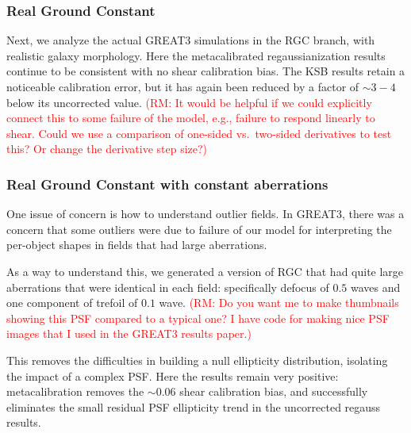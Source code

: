 \documentclass[iop]{emulateapj}
\newcommand\rmcomment[1]{\textcolor{red}{(RM: #1)}}
\begin{document}
\subsubsection{Real Ground Constant}

Next, we analyze the actual GREAT3 simulations in the RGC branch, with
realistic galaxy morphology. Here the metacalibrated regaussianization
results continue to be consistent with no shear calibration bias. The
KSB results retain a noticeable calibration error, but it has again
been reduced by a factor of $\sim3-4$ below its uncorrected value. 
\rmcomment{It would be helpful if we could explicitly connect this to some failure of the model,
  e.g., failure to respond linearly to shear.  Could we use a comparison of one-sided vs.\ two-sided
  derivatives to test this?  Or change the derivative step size?}


\subsubsection{Real Ground Constant with constant aberrations}

One issue of concern is how to understand outlier fields.  In GREAT3,
there was a concern that some outliers were due to failure of our
model for interpreting the per-object shapes in fields that had large
aberrations.

As a way to understand this, we generated a version of RGC that had
quite large aberrations that were identical in each field:
specifically defocus of $0.5$ waves and one component of trefoil of
$0.1$ wave. \rmcomment{Do you want me to make thumbnails showing this PSF compared to a typical one?
  I have code for making nice PSF images that I used in the GREAT3 results paper.}

This removes the difficulties in building a null ellipticity
distribution, isolating the impact of a complex PSF. Here the results
remain very positive: metacalibration removes the $\sim0.06$ shear
calibration bias, and successfully eliminates the small residual PSF
ellipticity trend in the uncorrected regauss results. 
\end{document}
